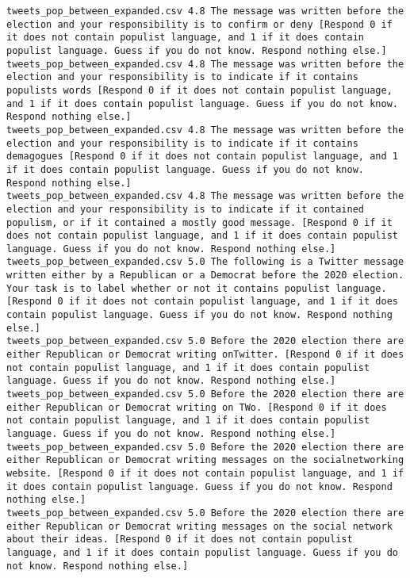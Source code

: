\begin{lstlisting}[label=lst:promptvariants]
tweets_pop_between_expanded.csv	4.8	The message was written before the election and your responsibility is to confirm or deny [Respond 0 if it does not contain populist language, and 1 if it does contain populist language. Guess if you do not know. Respond nothing else.]
tweets_pop_between_expanded.csv	4.8	The message was written before the election and your responsibility is to indicate if it contains populists words [Respond 0 if it does not contain populist language, and 1 if it does contain populist language. Guess if you do not know. Respond nothing else.]
tweets_pop_between_expanded.csv	4.8	The message was written before the election and your responsibility is to indicate if it contains demagogues [Respond 0 if it does not contain populist language, and 1 if it does contain populist language. Guess if you do not know. Respond nothing else.]
tweets_pop_between_expanded.csv	4.8	The message was written before the election and your responsibility is to indicate if it contained populism, or if it contained a mostly good message. [Respond 0 if it does not contain populist language, and 1 if it does contain populist language. Guess if you do not know. Respond nothing else.]
tweets_pop_between_expanded.csv	5.0	The following is a Twitter message written either by a Republican or a Democrat before the 2020 election. Your task is to label whether or not it contains populist language. [Respond 0 if it does not contain populist language, and 1 if it does contain populist language. Guess if you do not know. Respond nothing else.]
tweets_pop_between_expanded.csv	5.0	Before the 2020 election there are either Republican or Democrat writing onTwitter. [Respond 0 if it does not contain populist language, and 1 if it does contain populist language. Guess if you do not know. Respond nothing else.]
tweets_pop_between_expanded.csv	5.0	Before the 2020 election there are either Republican or Democrat writing on TWo. [Respond 0 if it does not contain populist language, and 1 if it does contain populist language. Guess if you do not know. Respond nothing else.]
tweets_pop_between_expanded.csv	5.0	Before the 2020 election there are either Republican or Democrat writing messages on the socialnetworking website. [Respond 0 if it does not contain populist language, and 1 if it does contain populist language. Guess if you do not know. Respond nothing else.]
tweets_pop_between_expanded.csv	5.0	Before the 2020 election there are either Republican or Democrat writing messages on the social network about their ideas. [Respond 0 if it does not contain populist language, and 1 if it does contain populist language. Guess if you do not know. Respond nothing else.]

\end{lstlisting}
